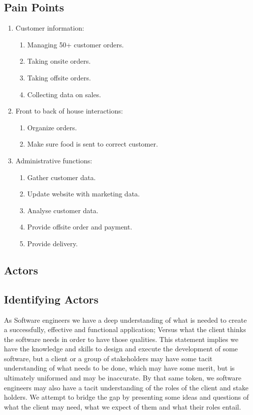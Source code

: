 \documentclass{article}
\begin{document}
\subsection{Pain Points}
\begin{enumerate}
    \item Customer information:
    \begin{enumerate}
        \item Managing 50+ customer orders.
        \item Taking onsite orders.
        \item Taking offsite orders.
        \item Collecting data on sales.
        \end{enumerate}
    \item Front to back of house interactions:
    \begin{enumerate}
        \item Organize orders.
        \item Make sure food is sent to correct customer.
    \end{enumerate}
    \item Administrative functions:
    \begin{enumerate}
        \item Gather customer data.
        \item Update website with marketing data.
        \item Analyse customer data.
        \item Provide offsite order and payment.
        \item Provide delivery.
    \end{enumerate}
\end{enumerate}





\subsection{Actors}
\subsection{Identifying Actors}

As Software engineers we have a deep understanding of what is needed to create a successfully, effective and functional application; Versus what the client thinks the software needs in order to have those qualities. This statement implies we have the knowledge and skills to design and execute the development of some software, but a client or a group of stakeholders may have some tacit understanding of what needs to be done, which may have some merit, but is ultimately uniformed and may be inaccurate. By that same token, we software engineers may also have a tacit understanding of the roles of the client and stake holders. We attempt to bridge the gap by presenting some ideas and questions of what the client may need, what we expect of them and what their roles entail. 
\end{document}
